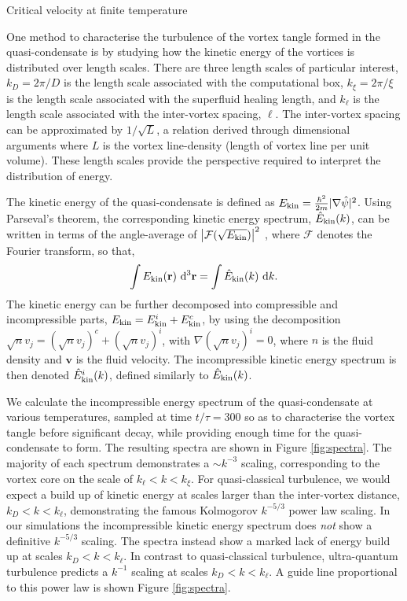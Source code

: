 \begin{chapter}{\label{cha:nonequib}Critical velocity at finite temperature}
\begin{figure}
\end{figure}
One method to characterise the turbulence of the vortex tangle formed in the quasi-condensate is by studying how the kinetic energy of the vortices is distributed over length scales. There are three length scales of particular interest, $k_D=2\pi/D$ is the length scale associated with the computational box, $k_\xi = 2\pi/\xi$ is the length scale associated with the superfluid healing length, and $k_\ell$ is the length scale associated with the inter-vortex spacing, $\ell$. The inter-vortex spacing can be approximated by $1/\sqrt{L}$, a relation derived through dimensional arguments where $L$ is the vortex line-density (length of vortex line per unit volume). These length scales provide the perspective required to interpret the distribution of energy.

The kinetic energy of the quasi-condensate is defined as $E_{\rm kin} = \frac{\hbar^2}{2m}|\nabla \hat\psi|^2$.
 Using Parseval's theorem, the corresponding kinetic energy spectrum, $\hat{E}_{\rm kin}(k)$, can be written in terms of the angle-average of $\left |\mathcal{F}(\sqrt{E_{\rm kin}})\right |^2$ \cite{Nore},
where $\mathcal{F}$ denotes the Fourier transform, so that,
\begin{equation}
  \int E_{\rm kin}({\bf r})~{\rm d}^3{\bf r} = \int \hat{E}_{\rm kin}(k)~{\mathrm d}k.
  \label{eq:Ekin}
\end{equation}
The kinetic energy can be further decomposed into compressible and incompressible parts, $E_{\rm kin} = E^i_{\rm kin} + E^c_{\rm kin}$, by using the decomposition $\sqrt{n}v_j = (\sqrt{n}v_j)^c + (\sqrt{n}v_j)^i$, with $\nabla(\sqrt{n}v_j)^i=0$, where $n$ is the fluid density and $\mathbf{v}$ is the fluid velocity. The incompressible kinetic energy spectrum is then denoted $\hat{E}^i_{\rm kin}(k)$, defined similarly to $\hat{E}_{\rm kin}(k)$.

We calculate the incompressible energy spectrum of the quasi-condensate at various temperatures, sampled at time $t/\tau=300$ so as to characterise the vortex tangle before significant decay, while providing enough time for the quasi-condensate to form. The resulting spectra are shown in Figure \ref{fig:spectra}. The majority of each spectrum demonstrates a $\sim k^{-3}$ scaling, corresponding to the vortex core on the scale of $k_\ell<k<k_\xi$. For quasi-classical turbulence, we would expect a build up of kinetic energy at scales larger than the inter-vortex distance, $k_D<k<k_\ell$, demonstrating the famous Kolmogorov $k^{-5/3}$ power law scaling. In our simulations the incompressible kinetic energy spectrum does {\it not} show a definitive $k^{-5/3}$ scaling. The spectra instead show a marked lack of energy build up at scales $k_D<k<k_\ell$. In contrast to quasi-classical turbulence, ultra-quantum turbulence predicts a $k^{-1}$ scaling at scales $k_D<k<k_\ell$. A guide line proportional to this power law is shown Figure \ref{fig:spectra}.


\end{chapter}
